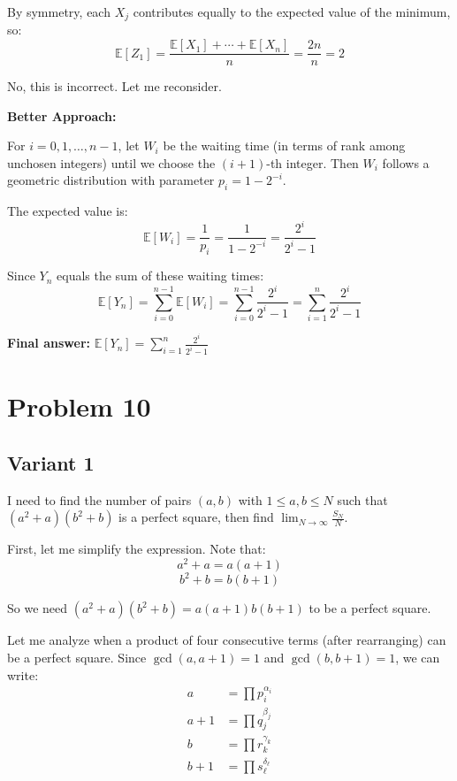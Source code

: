 \documentclass[12pt,a4paper]{article}
\theoremstyle{definition}
\begin{document}
        By symmetry, each $X_j$ contributes equally to the expected value of the minimum, so:
        $$\mathbb{E}[Z_1] = \frac{\mathbb{E}[X_1] + \cdots + \mathbb{E}[X_n]}{n} = \frac{2n}{n} = 2$$

        No, this is incorrect. Let me reconsider.

        \textbf{Better Approach:}

        For $i = 0, 1, \ldots, n-1$, let $W_i$ be the waiting time (in terms of rank among unchosen integers) until we choose the $(i+1)$-th integer. Then $W_i$ follows a geometric distribution with parameter $p_i = 1 - 2^{-i}$.

        The expected value is:
        $$\mathbb{E}[W_i] = \frac{1}{p_i} = \frac{1}{1 - 2^{-i}} = \frac{2^i}{2^i - 1}$$

        Since $Y_n$ equals the sum of these waiting times:
        $$\mathbb{E}[Y_n] = \sum_{i=0}^{n-1} \mathbb{E}[W_i] = \sum_{i=0}^{n-1} \frac{2^i}{2^i - 1} = \sum_{i=1}^{n} \frac{2^i}{2^i - 1}$$

        \textbf{Final answer:} $\mathbb{E}[Y_n] = \sum_{i=1}^{n}\frac{2^i}{2^i - 1}$


\section{Problem 10}
\subsection{Variant 1}
    I need to find the number of pairs $(a,b)$ with $1 \leq a,b \leq N$ such that $(a^2+a)(b^2+b)$ is a perfect square, then find $\lim_{N \to \infty} \frac{S_N}{N}$.

    First, let me simplify the expression. Note that:
    $$a^2 + a = a(a+1)$$
    $$b^2 + b = b(b+1)$$

    So we need $(a^2+a)(b^2+b) = a(a+1)b(b+1)$ to be a perfect square.

    Let me analyze when a product of four consecutive terms (after rearranging) can be a perfect square. Since $\gcd(a, a+1) = 1$ and $\gcd(b, b+1) = 1$, we can write:
    \begin{align}
        a &= \prod p_i^{\alpha_i}\\
        a+1 &= \prod q_j^{\beta_j}\\
        b &= \prod r_k^{\gamma_k}\\
        b+1 &= \prod s_\ell^{\delta_\ell}
    \end{align}
\end{document}
